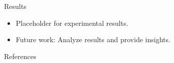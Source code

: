 \documentclass{beamer}
\begin{document}


\begin{frame}{Results}
\begin{itemize}
    \item Placeholder for experimental results.
    \item Future work: Analyze results and provide insights.
\end{itemize}
\end{frame}

\begin{frame}[allowframebreaks]{References}
    \printbibliography
\end{frame}
\end{document}
